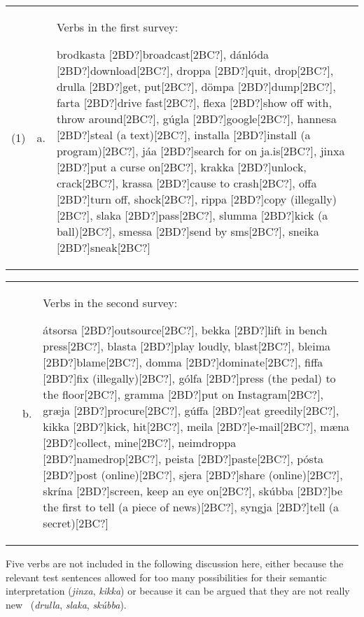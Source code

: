 \begin{flushleft}
\tablefirsthead{}
\tablehead{}
\tabletail{}
\tablelasttail{}
\begin{supertabular}{m{0.31505984in}m{0.23655984in}m{3.9566598in}}
(1) &
a. &
Verbs in the first survey: 

brodkasta [2BD?]broadcast[2BC?], dánlóda [2BD?]download[2BC?], droppa [2BD?]quit, drop[2BC?], drulla [2BD?]get, put[2BC?], dömpa [2BD?]dump[2BC?], farta [2BD?]drive fast[2BC?], flexa [2BD?]show off with, throw around[2BC?], gúgla [2BD?]google[2BC?], hannesa [2BD?]steal (a text)[2BC?], installa [2BD?]install (a program)[2BC?], jáa [2BD?]search for on ja.is[2BC?], jinxa [2BD?]put a curse on[2BC?], krakka [2BD?]unlock, crack[2BC?], krassa [2BD?]cause to crash[2BC?], offa [2BD?]turn off, shock[2BC?], rippa [2BD?]copy (illegally)[2BC?], slaka [2BD?]pass[2BC?], slumma [2BD?]kick (a ball)[2BC?], smessa [2BD?]send by sms[2BC?], sneika [2BD?]sneak[2BC?]\\
\end{supertabular}
\end{flushleft}
\begin{flushleft}
\tablefirsthead{}
\tablehead{}
\tabletail{}
\tablelasttail{}
\begin{supertabular}{m{0.31505984in}m{0.23655984in}m{3.9566598in}}
 &
b. &
Verbs in the second survey: 

átsorsa [2BD?]outsource[2BC?], bekka [2BD?]lift in bench press[2BC?], blasta [2BD?]play loudly, blast[2BC?], bleima [2BD?]blame[2BC?], domma [2BD?]dominate[2BC?], fiffa [2BD?]fix (illegally)[2BC?], gólfa [2BD?]press (the pedal) to the floor[2BC?], gramma [2BD?]put on Instagram[2BC?], græja [2BD?]procure[2BC?], gúffa [2BD?]eat greedily[2BC?], kikka [2BD?]kick, hit[2BC?], meila [2BD?]e-mail[2BC?], mæna [2BD?]collect, mine[2BC?], neimdroppa [2BD?]namedrop[2BC?], peista [2BD?]paste[2BC?], pósta [2BD?]post (online)[2BC?], sjera [2BD?]share (online)[2BC?], skrína [2BD?]screen, keep an eye on[2BC?], skúbba [2BD?]be the first to tell (a piece of news)[2BC?], syngja [2BD?]tell (a secret)[2BC?]\\
\end{supertabular}
\end{flushleft}
\begin{styleStandard}
Five verbs are not included in the following discussion here, either because the relevant test sentences allowed for too many possibilities for their semantic interpretation (\textit{jinxa}, \textit{kikka}) or because it can be argued that they are not really new \ (\textit{drulla}, \textit{slaka}, \textit{skúbba}). 
\end{styleStandard}

